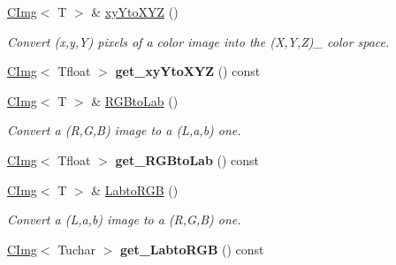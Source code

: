 \begin{DoxyCompactItemize}
\item 
\hypertarget{structcimg__library_1_1CImg_a7387432af686bbc6c973e7b2ceb2b80b}{
\hyperlink{structcimg__library_1_1CImg}{CImg}$<$ T $>$ \& \hyperlink{structcimg__library_1_1CImg_a7387432af686bbc6c973e7b2ceb2b80b}{xyYtoXYZ} ()}
\label{structcimg__library_1_1CImg_a7387432af686bbc6c973e7b2ceb2b80b}

\begin{DoxyCompactList}\small\item\em Convert (x,y,Y) pixels of a color image into the (X,Y,Z)\_ color space. \item\end{DoxyCompactList}\item 
\hypertarget{structcimg__library_1_1CImg_a92e6fb003aef1e34e3f09a9a86002a1c}{
\hyperlink{structcimg__library_1_1CImg}{CImg}$<$ Tfloat $>$ {\bfseries get\_\-xyYtoXYZ} () const }
\label{structcimg__library_1_1CImg_a92e6fb003aef1e34e3f09a9a86002a1c}

\item 
\hypertarget{structcimg__library_1_1CImg_aeb2b9b79af81584352a2e5f056b1a6df}{
\hyperlink{structcimg__library_1_1CImg}{CImg}$<$ T $>$ \& \hyperlink{structcimg__library_1_1CImg_aeb2b9b79af81584352a2e5f056b1a6df}{RGBtoLab} ()}
\label{structcimg__library_1_1CImg_aeb2b9b79af81584352a2e5f056b1a6df}

\begin{DoxyCompactList}\small\item\em Convert a (R,G,B) image to a (L,a,b) one. \item\end{DoxyCompactList}\item 
\hypertarget{structcimg__library_1_1CImg_a29a2963650982ba4bf8c7fc0c451f7f0}{
\hyperlink{structcimg__library_1_1CImg}{CImg}$<$ Tfloat $>$ {\bfseries get\_\-RGBtoLab} () const }
\label{structcimg__library_1_1CImg_a29a2963650982ba4bf8c7fc0c451f7f0}

\item 
\hypertarget{structcimg__library_1_1CImg_aa710f60075b3bc24790f17a7dc30e425}{
\hyperlink{structcimg__library_1_1CImg}{CImg}$<$ T $>$ \& \hyperlink{structcimg__library_1_1CImg_aa710f60075b3bc24790f17a7dc30e425}{LabtoRGB} ()}
\label{structcimg__library_1_1CImg_aa710f60075b3bc24790f17a7dc30e425}

\begin{DoxyCompactList}\small\item\em Convert a (L,a,b) image to a (R,G,B) one. \item\end{DoxyCompactList}\item 
\hypertarget{structcimg__library_1_1CImg_a91ac40e606effa38c3d4178f41a5e478}{
\hyperlink{structcimg__library_1_1CImg}{CImg}$<$ Tuchar $>$ {\bfseries get\_\-LabtoRGB} () const }
\label{structcimg__library_1_1CImg_a91ac40e606effa38c3d4178f41a5e478}


\end{DoxyCompactItemize}
